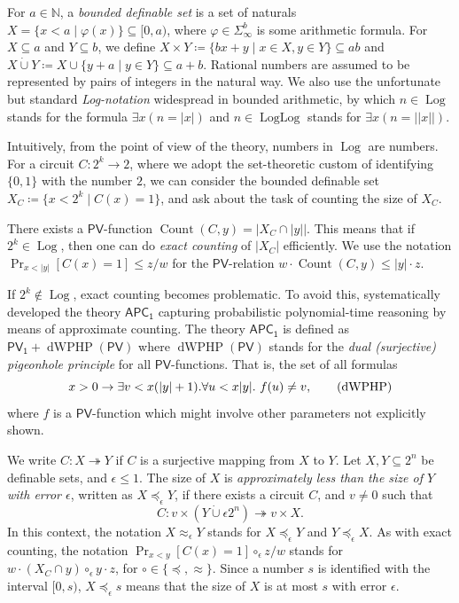 \documentclass[11pt]{article}
\renewcommand{\PV}{\mathsf{PV}}
\newcommand{\PVO}{\mathsf{PV_1}}
\newcommand{\APC}{\mathsf{APC_1}}
\newcommand{\dWPHP}{\operatorname{dWPHP}}
\theoremstyle{definition}
\theoremstyle{plain}
\theoremstyle{remark}
\newcommand{\EmilU}{\mathbin{\dot{\cup}}}
\newcommand{\bN}{\mathbb{N}}
\newcommand{\Log}{\operatorname{Log}}
\newcommand{\LogLog}{\operatorname{LogLog}}
\begin{document}
For $a\in \bN$, a \emph{bounded definable set} is a set of naturals $X = \{ x< a \mid \varphi(x) \} \subseteq [0, a)$, where $\varphi \in \Sigma_{\infty}^b$ is some arithmetic formula. For $X\subseteq a$ and $Y\subseteq b$, we define $X\times Y \coloneqq \{bx+y\mid x\in X, y\in Y\}\subseteq ab$ and $X\EmilU Y \coloneqq X\cup\{y+a\mid y\in Y\}\subseteq a+b$. Rational numbers are assumed to be represented by pairs of integers in the natural way. We also use the unfortunate but standard \emph{Log-notation} widespread in bounded arithmetic, by which $n\in \Log$ stands for the formula $\exists x (n = |x|)$ and $n \in \LogLog$ stands for $\exists x (n = ||x||)$.

Intuitively, from the point of view of the theory, numbers in $\Log$ are  numbers. For a circuit $C : 2^k \to 2$, where we adopt the set-theoretic custom of identifying $\{0,1\}$ with the number $2$, we can consider the bounded definable set $X_C \coloneqq \{ x<2^k \mid  C(x) = 1 \}$, and ask about the task of counting the size of $X_C$.

There exists a $\PV$-function $\operatorname{Count}(C, y) = |X_C \cap |y||$. This means that if $2^k \in \Log$, then one can do \emph{exact counting} of $|X_C|$ efficiently. We use the notation $\Pr_{x<|y|}[C(x) =1] \leq z/w$ for the $\PV$-relation $w \cdot \operatorname{Count}(C,y) \leq |y| \cdot z$.

If $2^k \not\in \Log$, exact counting becomes problematic. To avoid this, \citeauthor{Jer07} \cite{Jer05-PhD,Jer07} systematically developed the theory $\APC$ capturing probabilistic polynomial-time reasoning by means of approximate counting. The theory $\APC$ is defined as $\PVO + \dWPHP(\PV)$ where $\dWPHP(\PV)$ stands for the \emph{dual (surjective) pigeonhole principle} for all $\PV$-functions. That is, the set of all formulas
\begin{equation*}
    x>0\rightarrow\exists v<x(|y|+1).\forall u<x|y|.\ f(u)\neq v, \tag{$\dWPHP$}
\end{equation*}
where $f$ is a $\PV$-function which might involve other parameters not explicitly shown.

We write $C:X\twoheadrightarrow Y$ if $C$ is a surjective mapping from $X$ to $Y$. Let $X,Y\subseteq 2^n$ be definable sets, and $\epsilon\leq 1$. The size of $X$ is \emph{approximately less than the size of $Y$ with error $\epsilon$}, written as $X\preceq_{\epsilon} Y$, if there exists a circuit $C$, and $v\neq 0$ such that
$$C: v\times (Y\EmilU \epsilon 2^n)\twoheadrightarrow v\times X.$$
In this context, the notation $X\approx_{\epsilon}Y$ stands for $X\preceq_{\epsilon} Y$ and $Y\preceq_{\epsilon} X$. As with exact counting, the notation $\Pr_{x<y}[C(x) = 1] \circ_\epsilon z/w$ stands for $w \cdot (X_C \cap y) \circ_{\epsilon} y\cdot z$, for $\circ \in \{ \preceq, \approx\}$. Since a number $s$ is identified with the interval $[0,s)$, $X\preceq_{\epsilon} s$ means that the size of $X$ is at most $s$ with error $\epsilon$.
\end{document}
